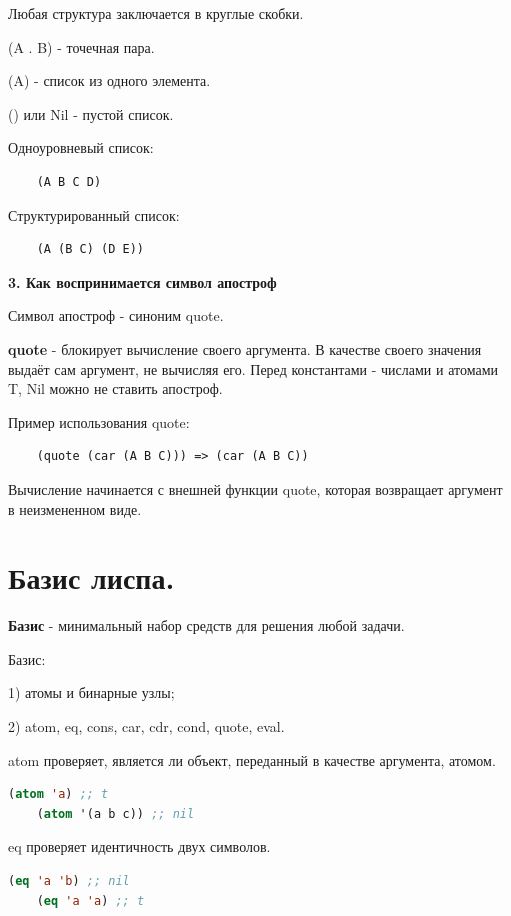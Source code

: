 Любая структура заключается в круглые скобки.

(A . B) - точечная пара.

(A) - список из одного элемента.

() или Nil - пустой список.

Одноуровневый список:
\begin{lstlisting}
	(A B C D)
\end{lstlisting}

Структурированный список:
\begin{lstlisting}
	(A (B C) (D E))
\end{lstlisting}

\textbf{3. Как воспринимается символ апостроф}

Символ апостроф - синоним quote.

\textbf{quote} - блокирует вычисление своего аргумента.
В качестве своего значения выдаёт сам аргумент, не вычисляя его.
Перед константами - числами и атомами T, Nil можно не ставить апостроф.

Пример использования quote:
\begin{lstlisting}
	(quote (car (A B C))) => (car (A B C))
\end{lstlisting}


Вычисление начинается с внешней функции quote, которая возвращает аргумент в неизмененном виде.

\section{Базис лиспа.}

\textbf{Базис} - минимальный набор средств для решения любой задачи.

Базис:

1) атомы и бинарные узлы;

2) atom, eq, cons, car, cdr, cond, quote, eval.

atom проверяет, является ли объект, переданный в качестве аргумента, атомом.

\begin{lstlisting}[language=Lisp]
	(atom 'a) ;; t
	(atom '(a b c)) ;; nil
\end{lstlisting}

eq проверяет идентичность двух символов.
\begin{lstlisting}[language=Lisp]
	(eq 'a 'b) ;; nil
	(eq 'a 'a) ;; t
\end{lstlisting}

